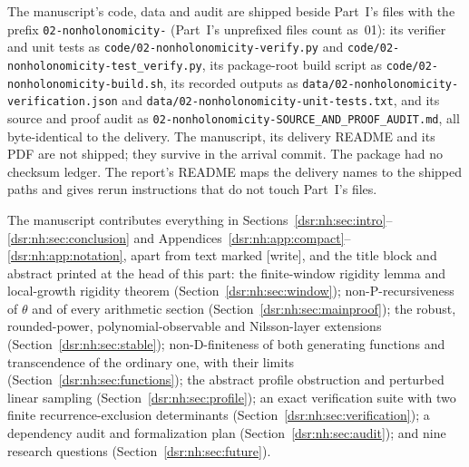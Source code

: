 \documentclass[11pt,a4paper]{article}
\numberwithin{equation}{section}
\theoremstyle{definition}
\theoremstyle{remark}
\newcommand{\wtag}{\textup{[write]}}
\newcommand{\lean}[1]{\nolinkurl{#1}}
\theoremstyle{definition}
\theoremstyle{plain}
\begin{document}
{\raggedright The manuscript's code, data and audit are shipped beside Part~I's files
with the prefix \lean{02-nonholonomicity-} (Part~I's unprefixed files count
as~01): its verifier and unit tests as
\lean{code/02-nonholonomicity-verify.py} and
\lean{code/02-nonholonomicity-test_verify.py}, its package-root build script
as \lean{code/02-nonholonomicity-build.sh}, its recorded outputs as
\lean{data/02-nonholonomicity-verification.json} and
\lean{data/02-nonholonomicity-unit-tests.txt}, and its source and proof
audit as \lean{02-nonholonomicity-SOURCE_AND_PROOF_AUDIT.md}, all
byte-identical to the delivery. The manuscript, its delivery README and its
PDF are not shipped; they survive in the arrival commit. The package had no
checksum ledger. The report's README maps the delivery names to the shipped
paths and gives rerun instructions that do not touch Part~I's files.\par}

The manuscript contributes everything in
Sections~\ref{dsr:nh:sec:intro}--\ref{dsr:nh:sec:conclusion} and
Appendices~\ref{dsr:nh:app:compact}--\ref{dsr:nh:app:notation}, apart from
text marked \wtag, and the title block and abstract printed at the head of
this part: the finite-window rigidity lemma and local-growth rigidity
theorem (Section~\ref{dsr:nh:sec:window}); non-P-recursiveness of
$\theta$ and of every arithmetic section (Section~\ref{dsr:nh:sec:mainproof});
the robust, rounded-power, polynomial-observable and Nilsson-layer
extensions (Section~\ref{dsr:nh:sec:stable}); non-D-finiteness of both
generating functions and transcendence of the ordinary one, with their
limits (Section~\ref{dsr:nh:sec:functions}); the abstract profile
obstruction and perturbed linear sampling
(Section~\ref{dsr:nh:sec:profile}); an exact verification suite with two
finite recurrence-exclusion determinants (Section~\ref{dsr:nh:sec:verification});
a dependency audit and formalization plan (Section~\ref{dsr:nh:sec:audit});
and nine research questions (Section~\ref{dsr:nh:sec:future}).
\end{document}
